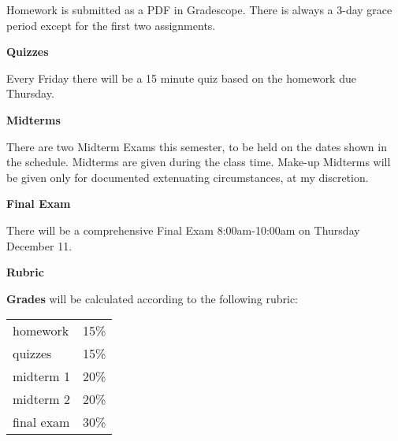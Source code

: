 \documentclass[12pt]{article}
\begin{document}
Homework is submitted as a PDF in Gradescope. There is always a 3-day grace period except for the first two assignments.

%

{\textbf{\large{Quizzes}}}

Every Friday there will be a 15 minute quiz based on the homework due Thursday.

%

{\textbf{\large{Midterms}}}

There are two Midterm Exams this semester, to be held on the dates shown in the schedule.  Midterms are given during the class time.  Make-up Midterms will be given only for documented extenuating circumstances, at my discretion.

{\textbf{\large{Final Exam}}}

There will be a comprehensive Final Exam 8:00am-10:00am on Thursday December 11.

{\textbf{\large{Rubric}}}

\begin{multicols}{2}
\textbf{Grades} will be calculated according to the following rubric:


\begin{tabular}{|l|c|}
  \hline
  homework & 15\% \\
  quizzes & 15\%\\
  midterm 1 & 20\%\\
  midterm 2 & 20\%\\
  final exam & 30\% \\
  \hline
\end{tabular}
\end{multicols}
\end{document}
